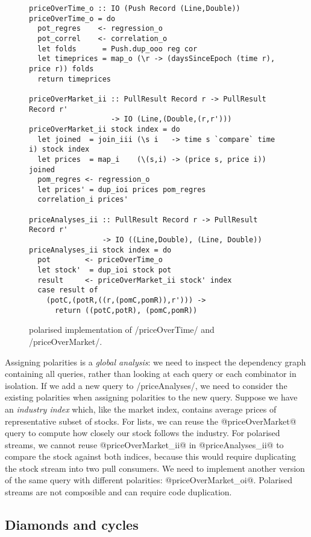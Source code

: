 \begin{figure}
\begin{lstlisting}
priceOverTime_o :: IO (Push Record (Line,Double))
priceOverTime_o = do
  pot_regres    <- regression_o
  pot_correl    <- correlation_o
  let folds      = Push.dup_ooo reg cor
  let timeprices = map_o (\r -> (daysSinceEpoch (time r), price r)) folds
  return timeprices

priceOverMarket_ii :: PullResult Record r -> PullResult Record r'
                   -> IO (Line,(Double,(r,r')))
priceOverMarket_ii stock index = do
  let joined  = join_iii (\s i   -> time s `compare` time i) stock index
  let prices  = map_i    (\(s,i) -> (price s, price i))      joined
  pom_regres <- regression_o
  let prices' = dup_ioi prices pom_regres
  correlation_i prices'

priceAnalyses_ii :: PullResult Record r -> PullResult Record r'
                 -> IO ((Line,Double), (Line, Double))
priceAnalyses_ii stock index = do
  pot        <- priceOverTime_o
  let stock'  = dup_ioi stock pot
  result     <- priceOverMarket_ii stock' index
  case result of 
    (potC,(potR,((r,(pomC,pomR)),r'))) ->
      return ((potC,potR), (pomC,pomR))
\end{lstlisting}
\caption[Polarised implementation of priceOverTime and priceOverMarket]{polarised implementation of \Hs/priceOverTime/ and \Hs/priceOverMarket/.}
\label{figs/impl/polar/priceOverTime-priceOverMarket}
\end{figure}

Assigning polarities is a \emph{global analysis}: we need to inspect the dependency graph containing all queries, rather than looking at each query or each combinator in isolation.
If we add a new query to \Hs/priceAnalyses/, we need to consider the existing polarities when assigning polarities to the new query.
Suppose we have an \emph{industry index} which, like the market index, contains average prices of representative subset of stocks.
For lists, we can reuse the @priceOverMarket@ query to compute how closely our stock follows the industry.
For polarised streams, we cannot reuse @priceOverMarket_ii@ in @priceAnalyses_ii@ to compare the stock against both indices, because this would require duplicating the stock stream into two pull consumers.
We need to implement another version of the same query with different polarities: @priceOverMarket_oi@.
Polarised streams are not composible and can require code duplication.

\subsection{Diamonds and cycles}

